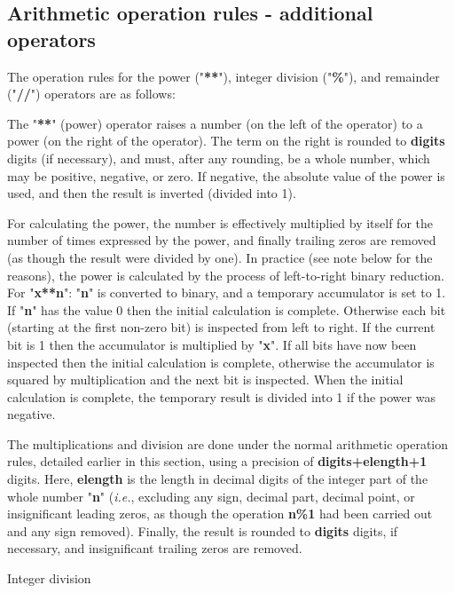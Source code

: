 \subsection{Arithmetic operation rules - additional operators}
 The operation rules for the power ("\textbf{**}"),
integer division ("\textbf{\%}"), and remainder
("\textbf{//}") operators are as follows:
\begin{description}
\item[Power]\label{refpower}

\index{,}
The "\textbf{**}" (power) operator raises a number (on the
left of the operator) to a power (on the right of the operator).
The term on the right is rounded to \textbf{digits} digits (if
necessary), and must, after any rounding, be a whole number, which may
be positive, negative, or zero.
If negative, the absolute value of the power is used, and then the
result is inverted (divided into 1).
 
For calculating the power, the number is effectively multiplied by
itself for the number of times expressed by the power, and finally
trailing zeros are removed (as though the result were divided by one).
 In practice (see note below for the reasons), the power is
calculated by the process of left-to-right binary reduction.
For "\textbf{x**n}": "\textbf{n}" is converted to
binary, and a temporary accumulator is set to 1.
If "\textbf{n}" has the value 0 then the initial calculation is
complete.
Otherwise each bit (starting at the first non-zero bit) is inspected
from left to right.
If the current bit is 1 then the accumulator is multiplied by
"\textbf{x}".
If all bits have now been inspected then the initial calculation is
complete, otherwise the accumulator is squared by multiplication and the
next bit is inspected.
When the initial calculation is complete, the temporary result is
divided into 1 if the power was negative.
 
The multiplications and division are done under the normal
arithmetic operation rules, detailed earlier in this section, using a
precision of \textbf{digits+elength+1} digits.
Here, \textbf{elength} is the length in decimal digits of the integer
part of the whole number "\textbf{n}" (\emph{i.e.}, excluding any sign,
decimal part, decimal point, or insignificant leading zeros, as though
the operation \textbf{n\%1} had been carried out and any sign removed).
Finally, the result is rounded to \textbf{digits} digits, if
necessary, and insignificant trailing zeros are removed.
\item{Integer division}


\end{description}
